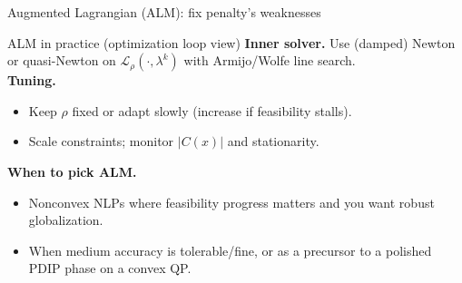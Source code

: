 \begin{frame}[t]{Augmented Lagrangian (ALM): fix penalty’s weaknesses}

 
 
 

\end{frame}




\begin{frame}{ALM in practice (optimization loop view)}
\textbf{Inner solver.} Use (damped) Newton or quasi-Newton on $\mathcal{L}_\rho(\cdot,\lambda^k)$ with Armijo/Wolfe line search. \\
\textbf{Tuning.}
\begin{itemize}
\item Keep $\rho$ fixed or adapt slowly (increase if feasibility stalls).
\item Scale constraints; monitor $|C(x)|$ and stationarity.
\end{itemize}
\textbf{When to pick ALM.}
\begin{itemize}
\item Nonconvex NLPs where feasibility progress matters and you want robust globalization.
\item When medium accuracy is tolerable/fine, or as a precursor to a polished PDIP phase on a convex QP.
\end{itemize}

\end{frame}









